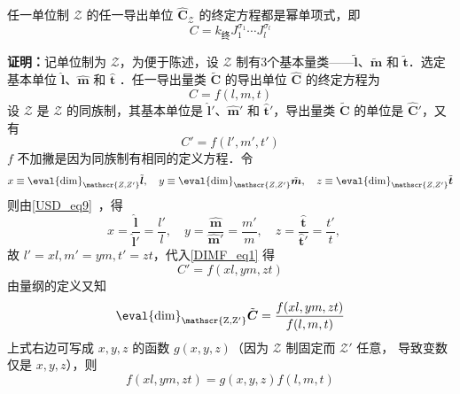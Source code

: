 \begin{theorem}{}\label{DIMF_the2}
任一单位制 $\mathscr{Z}$ 的任一导出单位 $\hat{\boldsymbol{C}}_{ \mathscr{Z}}$ 的终定方程都是幂单项式，即
\begin{equation}\label{DIMF_eq6}
C=k_{\text{终}}J_1^{\sigma_1}\cdots J_l^{\sigma_l}
\end{equation}
\end{theorem}
\textbf{证明：}记单位制为 $\mathscr{Z}$，为便于陈述，设 $\mathscr{Z}$ 制有3个基本量类——$\tilde{\boldsymbol{l}}$、$\tilde{\boldsymbol{m}}$ 和 $\tilde{\boldsymbol{t}}$．选定基本单位 $\hat{\boldsymbol{l}}$、$\hat{\boldsymbol{m}}$ 和 $\hat{\boldsymbol{t}}$ ．任一导出量类 $\tilde{\boldsymbol{C}}$ 的导出单位 $\hat{\boldsymbol{C}}$ 的终定方程为
\begin{equation}
C=f(l,m,t)
\end{equation}
设 $\mathscr{Z}$ 是 $\mathscr{Z}$ 的同族制，其基本单位是 $\hat{\boldsymbol{l}}'$、$\hat{\boldsymbol{m}}'$ 和 $\hat{\boldsymbol{t}}'$，导出量类 $\tilde{\boldsymbol{C}}$ 的单位是  $\hat{\boldsymbol{C}}'$，又有
\begin{equation}\label{DIMF_eq1}
C'=f(l',m',t')
\end{equation}
$f$ 不加撇是因为同族制有相同的定义方程．令
\begin{equation}
x\equiv \eval{\mathrm{dim}}_{\mathscr{Z,Z'}}\tilde{\boldsymbol{l}},\quad y\equiv \eval{\mathrm{dim}}_{\mathscr{Z,Z'}}\tilde{\boldsymbol{m}},\quad z\equiv \eval{\mathrm{dim}}_{\mathscr{Z,Z'}}\tilde{\boldsymbol{t}}
\end{equation}
则由\autoref{USD_eq9}~，得
\begin{equation}
x=\frac{\hat{\boldsymbol{l}}}{\hat{\boldsymbol{l}}'}=\frac{l'}{l},\quad y=\frac{\hat{\boldsymbol{m}}}{\hat{\boldsymbol{m}}'}=\frac{m'}{m},\quad z=\frac{\hat{\boldsymbol{t}}}{\hat{\boldsymbol{t}}'}=\frac{t'}{t},\quad 
\end{equation}
故 $l'=xl,m'=ym,t'=zt$，代入\autoref{DIMF_eq1} 得
\begin{equation}
C'=f(xl,ym,zt)
\end{equation}
由量纲的定义又知
\begin{equation}
\mathrm{\eval{dim}_{\mathscr{Z,Z'
}}}\tilde{\boldsymbol{C}}=\frac{f(xl,ym,zt)}{f(l,m,t)}
\end{equation}
上式右边可写成 $x,y,z$ 的函数 $g(x,y,z)$（因为 $\mathcal{Z}$ 制固定而 $\mathscr{Z'}$ 任意， 导致变数仅是 $x,y,z$），则
\begin{equation}\label{DIMF_eq2}
f(xl,ym,zt)=g(x,y,z)f(l,m,t)
\end{equation}

